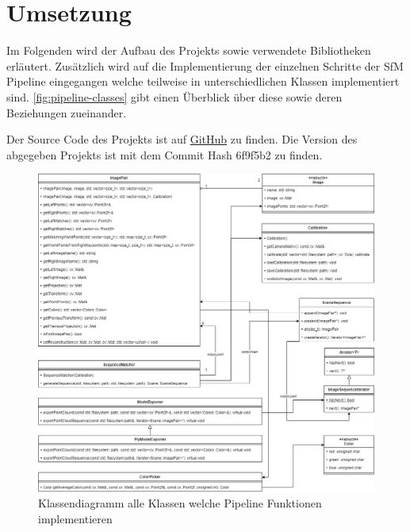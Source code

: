 \chapter{Umsetzung}\label{sec:implementation}
Im Folgenden wird der Aufbau des Projekts sowie verwendete Bibliotheken erläutert.
Zusätzlich wird auf die Implementierung der einzelnen Schritte der SfM Pipeline eingegangen welche teilweise in unterschiedlichen Klassen implementiert sind.
\autoref{fig:pipeline-classes} gibt einen Überblick über diese sowie deren Beziehungen zueinander.

Der Source Code des Projekts ist auf \href{https://github.com/sebschmitt/photogrammetry/tree/6f9f5b27f248810138fae68253b638a726df6269}{GitHub} zu finden.
Die Version des abgegeben Projekts ist mit dem Commit Hash 6f9f5b2 zu finden.


\begin{figure}
    \centering
    \includegraphics[width=\textwidth]{src/img/classes.jpg}
    \caption{Klassendiagramm alle Klassen welche Pipeline Funktionen implementieren}
    \label{fig:pipeline-classes}
\end{figure}









